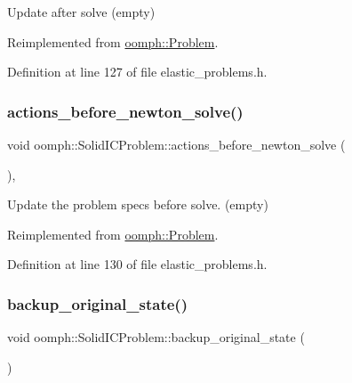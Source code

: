 Update after solve (empty) 



Reimplemented from \hyperlink{classoomph_1_1Problem_a033ec7301123deeb7e56d04c38f9f1da}{oomph\+::\+Problem}.



Definition at line 127 of file elastic\+\_\+problems.\+h.

\mbox{\label{classoomph_1_1SolidICProblem_ad234d3268b330cd2f532548103cb60fc}} 
\subsubsection{\texorpdfstring{actions\+\_\+before\+\_\+newton\+\_\+solve()}{actions\_before\_newton\_solve()}}
{\footnotesize\ttfamily void oomph\+::\+Solid\+I\+C\+Problem\+::actions\+\_\+before\+\_\+newton\+\_\+solve (\begin{DoxyParamCaption}{ }\end{DoxyParamCaption})\hspace{0.3cm}{\ttfamily [inline]}, {\ttfamily [virtual]}}



Update the problem specs before solve. (empty) 



Reimplemented from \hyperlink{classoomph_1_1Problem_a0c8d70891f7369bb4bf8412fa1a08ecb}{oomph\+::\+Problem}.



Definition at line 130 of file elastic\+\_\+problems.\+h.

\mbox{\label{classoomph_1_1SolidICProblem_a14343410dca129169282dd6d5081813d}} 
\subsubsection{\texorpdfstring{backup\+\_\+original\+\_\+state()}{backup\_original\_state()}}
{\footnotesize\ttfamily void oomph\+::\+Solid\+I\+C\+Problem\+::backup\+\_\+original\+\_\+state (\begin{DoxyParamCaption}{ }\end{DoxyParamCaption})\hspace{0.3cm}{\ttfamily [private]}}




